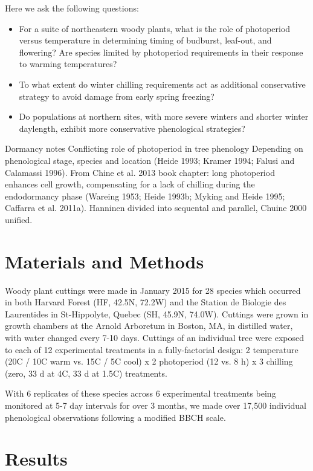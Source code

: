 \documentclass[11pt]{article}
\begin{document}
Here we ask the following questions:
\begin{itemize}
\item{For a suite of northeastern woody plants, what is the role of photoperiod versus temperature in determining timing of budburst, leaf-out, and flowering? Are species limited by photoperiod requirements in their response to warming temperatures?}
\item{To what extent do winter chilling requirements act as additional conservative strategy to avoid damage from early spring freezing?}
\item{Do populations at northern sites, with more severe winters and shorter winter daylength, exhibit more conservative phenological strategies?}
\end{itemize}


Dormancy notes
Conflicting role of photoperiod in tree phenology 
Depending on phenological stage, species and location (Heide 1993; Kramer 1994; Falusi and Calamassi 1996). 
From Chine et al. 2013 book chapter:
long photoperiod enhances cell growth, compensating for a lack of chilling during the endodormancy phase (Wareing 1953; Heide 1993b; Myking and Heide 1995; Caffarra et al. 2011a).
Hanninen divided into sequental and parallel, Chuine 2000 unified.

\section{Materials and Methods}

Woody plant cuttings were made in January 2015 for 28 species which occurred in both Harvard Forest (HF, 42.5\degree N, 72.2\degree W) and the Station de Biologie des Laurentides in St-Hippolyte, Quebec (SH, 45.9\degree N, 74.0\degree W). Cuttings were grown in growth chambers at the Arnold Arboretum in Boston, MA, in distilled water, with water changed every 7-10 days. Cuttings of an individual tree were exposed to each of 12 experimental treatments in a fully-factorial design: 2 temperature (20\degree C / 10\degree C warm vs. 15\degree C / 5\degree C cool) x 2 photoperiod (12 vs. 8 h) x 3 chilling (zero,  33 d at 4\degree C, 33 d at 1.5\degree C) treatments. 

With 6 replicates of these species across 6 experimental treatments being monitored at 5-7 day intervals for over 3 months, we made over 17,500 individual phenological observations following a modified BBCH scale.


\section{Results}
\end{document}
